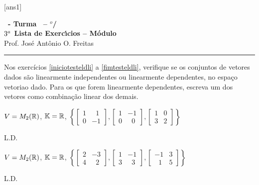 \documentclass[12pt]{exam}
\begin{document}
    [ans1]
    
    \begin{center}
        {\Large\bf \disciplina\ - Turma \turma\ -- \semestre$^{o}$/\ano} \\ \vspace{9pt} {\large\bf
            $3^a$ Lista de Exerc{\'\i}cios -- Módulo \numeromodulo}\\ \vspace{9pt} Prof. Jos{\'e} Ant{\^o}nio O. Freitas
    \end{center}
    
    \hrule

    Nos exercícios \ref{iniciotesteldli} a \ref{fimtesteldli}, verifique se os conjuntos de vetores dados são 
    linearmente independentes ou linearmente dependentes, 
    no espaço vetoriao dado. Para os que forem linearmente dependentes,
    escreva um dos vetores como combinação linear dos demais.

    \begin{exercicio}\label{iniciotesteldli}
        $V = M_2(\mathbb{R})$, $\mathbb{K} = \mathbb{R}$,
        $
            \left\{
                \begin{bmatrix}
                    1 & \phantom{x} 1\\
                    0 & -1
                \end{bmatrix},
                \begin{bmatrix}
                    1 & -1\\
                    0 & \phantom{x} 0
                \end{bmatrix},
                \begin{bmatrix}
                    1 & 0\\
                    3 & 2
                \end{bmatrix}
            \right\}
        $
        \begin{solucao}
            L.D.
        \end{solucao}
    \end{exercicio}

    \begin{exercicio}
        $V = M_2(\mathbb{R})$, $\mathbb{K} = \mathbb{R}$,
        $
            \left\{
                \begin{bmatrix}
                    2 & -3\\
                    4 & \phantom{x} 2
                \end{bmatrix},
                \begin{bmatrix}
                    1 & -1\\
                    3 & \phantom{x} 3
                \end{bmatrix},
                \begin{bmatrix}
                    -1 & 3\\
                    \phantom{x} 1 & 5
                \end{bmatrix}
            \right\}
        $
        \begin{solucao}
            L.D.
        \end{solucao}
    \end{exercicio}
    
\end{document}
